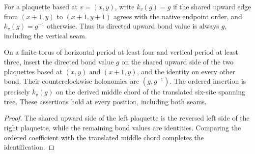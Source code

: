 \begin{definition}%
    \label{def:peps_torus_shared_flux_ordered_element}
    \leanok
    For a plaquette based at $v=(x,y)$, write $k_v(g)=g$ if the shared
    upward edge from $(x+1,y)$ to $(x+1,y+1)$ agrees with the native
    endpoint order, and $k_v(g)=g^{-1}$ otherwise. Thus its directed
    upward bond value is always $g$, including the vertical seam.
\end{definition}

\begin{lemma}%
    \label{thm:peps_torus_shared_flux_pair}
    \leanok
    On a finite torus of horizontal period at least four and vertical period
    at least three, insert the directed bond value $g$ on the shared upward side
    of the two plaquettes based at $(x,y)$ and $(x+1,y)$, and the identity
    on every other bond. Their counterclockwise holonomies are
    $(g,g^{-1})$. The ordered insertion is precisely $k_v(g)$ on the
    derived middle chord of the translated six-site spanning tree.
    These assertions hold at every position, including both seams.
\end{lemma}
\begin{proof}\leanok
    The shared upward side of the left plaquette is the reversed left side
    of the right plaquette, while the remaining bond values are identities.
    Comparing the ordered coefficient with the translated middle chord
    completes the identification.
\end{proof}

